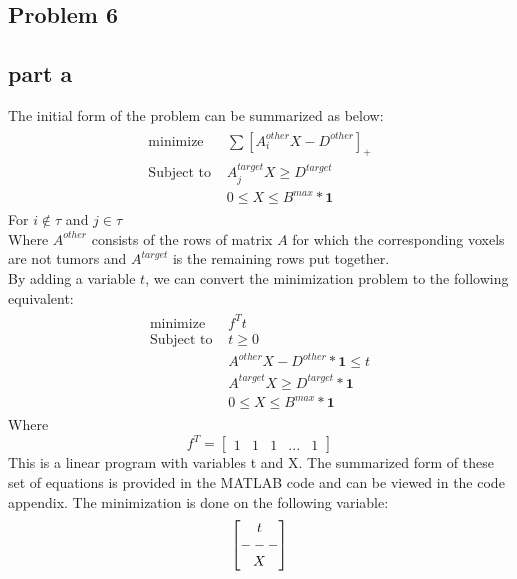 \documentclass[a4paper]{article}
\begin{document}
\begin{Large}
	\section*{Problem 6}
	\subsection*{part a}
	The initial form of the problem can be summarized as below:
	\begin{align}
	\begin{split}
		\text{minimize }& \sum[A^{other}_iX-D^{other}]_+\\
		\text{Subject to }& A^{target}_jX\geq D^{target}\\
		& 0 \leq X \leq B^{max}*\mathbf{1}
	\end{split}
	\end{align}
	For $ i \notin \tau $ and $ j \in \tau $\\
	Where $ A^{other} $ consists of the rows of matrix $ A $ for which the corresponding voxels are not tumors and $ A^{target} $ is the remaining rows put together.\\
	By adding a variable $ t $, we can convert the minimization problem to the following equivalent:
	\begin{align}
	\begin{split}
	\text{minimize }& f^Tt\\	
	\text{Subject to } & t\geq 0\\
	& A^{other}X-D^{other}*\mathbf{1} \leq t
	\\& A^{target}X\geq D^{target}*\mathbf{1}\\
	& 0 \leq X \leq B^{max}*\mathbf{1}
	\end{split}
	\end{align}
	Where 
	\[
	f^T=\begin{bmatrix}
	1& 1 &1& ...& 1
	\end{bmatrix}
	\]
	This is a linear program with variables t and X. The summarized form of these set of equations is provided in the MATLAB code and can be viewed in the code appendix. The minimization is done on the following variable:
	\[
	\begin{bmatrix}
	t\\\----\\
	X
	\end{bmatrix}
	\]
	\newpage

\end{Large}
\end{document}
